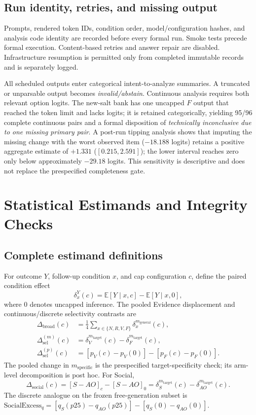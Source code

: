 \documentclass[letterpaper]{article}
\begin{document}
\subsection{Run identity, retries, and missing output}

Prompts, rendered token IDs, condition order, model/configuration hashes, and analysis code identity are recorded before every formal run.  Smoke tests precede formal execution.  Content-based retries and answer repair are disabled.  Infrastructure resumption is permitted only from completed immutable records and is separately logged.

All scheduled outputs enter categorical intent-to-analyze summaries.  A truncated or unparsable output becomes \emph{invalid/abstain}.  Continuous analysis requires both relevant option logits.  The new-salt bank has one uncapped $F$ output that reached the token limit and lacks logits; it is retained categorically, yielding 95/96 complete continuous pairs and a formal disposition of \emph{technically inconclusive due to one missing primary pair}.  A post-run tipping analysis shows that imputing the missing change with the worst observed item ($-18.188$ logits) retains a positive aggregate estimate of $+1.331$ ($[0.215,2.591]$); the lower interval reaches zero only below approximately $-29.18$ logits.  This sensitivity is descriptive and does not replace the prespecified completeness gate.

\section{Statistical Estimands and Integrity Checks}
\label{supp:inference}

\subsection{Complete estimand definitions}

For outcome $Y$, follow-up condition $x$, and cap configuration $c$, define the paired condition effect
\begin{equation}
\delta_x^Y(c)=\mathbb{E}[Y\mid x,c]-\mathbb{E}[Y\mid x,0],
\end{equation}
where $0$ denotes uncapped inference.  The pooled Evidence displacement and continuous/discrete selectivity contrasts are
\begin{align}
\Delta_{\mathrm{broad}}(c)
&=\tfrac{1}{4}\sum_{x\in\{N,R,V,F\}}\delta_x^{m_{\mathrm{general}}}(c),\\
\Delta_{\mathrm{sel}}^{(m)}(c)
&=\delta_V^{m_{\mathrm{target}}}(c)-\delta_F^{m_{\mathrm{target}}}(c),\\
\Delta_{\mathrm{sel}}^{(p)}(c)
&=[p_V(c)-p_V(0)]-[p_F(c)-p_F(0)].
\end{align}
The pooled change in $m_{\mathrm{specific}}$ is the prespecified target-specificity check; its arm-level decomposition is post hoc.  For Social,
\begin{equation}
\Delta_{\mathrm{social}}(c)
=[S-AO]_c-[S-AO]_0
=\delta_S^{m_{\mathrm{target}}}(c)-\delta_{AO}^{m_{\mathrm{target}}}(c).
\end{equation}
The discrete analogue on the frozen free-generation subset is
$\mathrm{SocialExcess}_q=[q_S(p25)-q_{AO}(p25)]-[q_S(0)-q_{AO}(0)]$.
\end{document}
